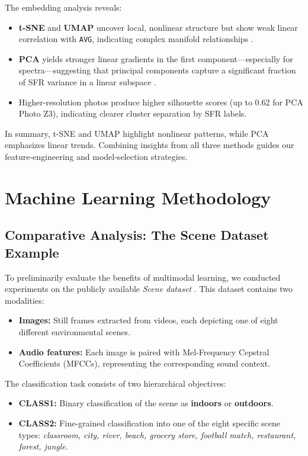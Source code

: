 \documentclass[english,bachelor,oneside]{ctufit-thesis}
\begin{document}
\noindent The embedding analysis reveals:
\begin{itemize}
  \item \textbf{t-SNE} and \textbf{UMAP} uncover local, nonlinear structure but show weak linear correlation with \texttt{AVG}, indicating complex manifold relationships \cite{maaten2008visualizing,mcinnes2018umap}.
  \item \textbf{PCA} yields stronger linear gradients in the first component—especially for spectra—suggesting that principal components capture a significant fraction of SFR variance in a linear subspace \cite{jolliffe2002principal}.
  \item Higher-resolution photos produce higher silhouette scores (up to 0.62 for PCA Photo Z3), indicating clearer cluster separation by SFR labels.
\end{itemize}

In summary, t-SNE and UMAP highlight nonlinear patterns, while PCA emphasizes linear trends. Combining insights from all three methods guides our feature‐engineering and model‐selection strategies.


\chapter{Machine Learning Methodology}
\label{ch:ml_methods}

\section{Comparative Analysis: The Scene Dataset Example}

To preliminarily evaluate the benefits of multimodal learning, we conducted experiments on the publicly available \textit{Scene dataset} \cite{SceneCla95:online}. This dataset contains two modalities:
\begin{itemize}
    \item \textbf{Images:} Still frames extracted from videos, each depicting one of eight different environmental scenes.
    \item \textbf{Audio features:} Each image is paired with Mel-Frequency Cepstral Coefficients (MFCCs), representing the corresponding sound context.
\end{itemize}

The classification task consists of two hierarchical objectives:
\begin{itemize}
    \item \textbf{CLASS1:} Binary classification of the scene as \textbf{indoors} or \textbf{outdoors}.
    \item \textbf{CLASS2:} Fine-grained classification into one of the eight specific scene types: \textit{classroom, city, river, beach, grocery store, football match, restaurant, forest, jungle}.
\end{itemize}
\end{document}
